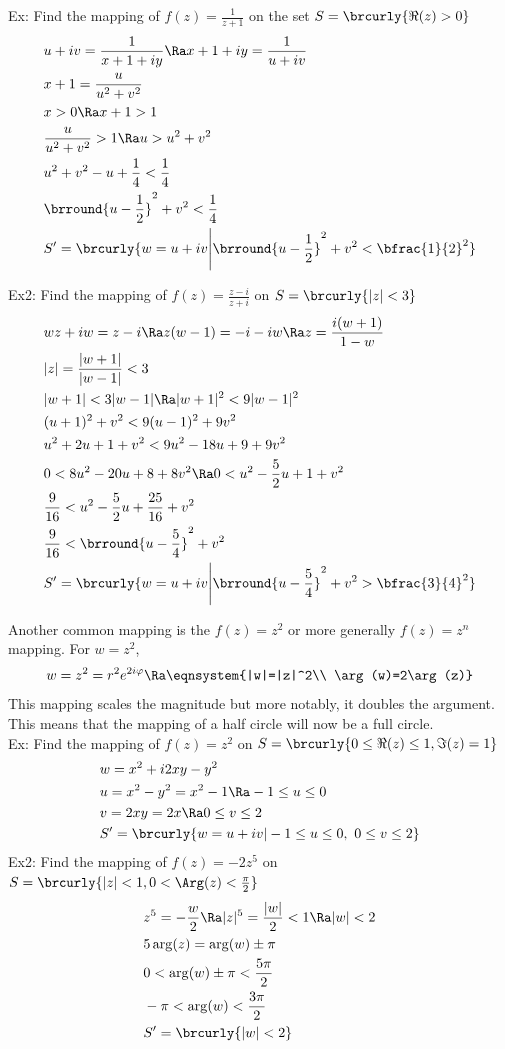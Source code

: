 Ex: Find the mapping of $f(z)=\frac{1}{z+1}$ on the set $S=\brcurly{\Re(z)>0}$ 
\begin{align*}
    &u+iv=\frac{1}{x+1+iy}\Ra x+1+iy=\frac{1}{u+iv}\\
    &x+1=\frac{u}{u^2+v^2}\\
    &x>0\Ra x+1>1\\
    &\frac{u}{u^2+v^2}>1\Ra u>u^2+v^2\\
    &u^2+v^2-u+\frac{1}{4}<\frac{1}{4}\\
    &\brround{u-\frac{1}{2}}^2+v^2<\frac{1}{4}\\
    &S'=\brcurly{w=u+iv\Bigg\vert\brround{u-\frac{1}{2}}^2+v^2<\bfrac{1}{2}^2}
\end{align*}

Ex2: Find the mapping of $f(z)=\frac{z-i}{z+i}$ on $S=\brcurly{|z|<3}$
\begin{align*}
    &wz+iw=z-i\Ra z(w-1)=-i-iw\Ra z=\frac{i(w+1)}{1-w}\\
    &|z|=\frac{|w+1|}{|w-1|}<3\\
    &|w+1|<3|w-1|\Ra |w+1|^2<9|w-1|^2\\
    &(u+1)^2+v^2<9(u-1)^2+9v^2\\
    &u^2+2u+1+v^2<9u^2-18u+9+9v^2\\
    &0<8u^2-20u+8+8v^2\Ra 0<u^2-\frac{5}{2}u+1+v^2\\
    &\frac{9}{16}<u^2-\frac{5}{2}u+\frac{25}{16}+v^2\\
    &\frac{9}{16}<\brround{u-\frac{5}{4}}^2+v^2\\
    &S'=\brcurly{w=u+iv\Bigg\vert\brround{u-\frac{5}{4}}^2+v^2>\bfrac{3}{4}^2}
\end{align*}

Another common mapping is the $f(z)=z^2$ or more generally $f(z)=z^n$ mapping.
For $w=z^2$,
\[w=z^2=r^2e^{2i\varphi}\Ra \eqnsystem{|w|=|z|^2\\ \arg(w)=2\arg(z)}\]
This mapping scales the magnitude but more notably, it doubles the argument. This means that the mapping of a half circle will now be a full circle.\\

Ex: Find the mapping of $f(z)=z^2$ on $S=\brcurly{0\leq \Re(z)\leq1,\Im(z)=1}$
\begin{align*}
    &w=x^2+i2xy-y^2\\
    &u=x^2-y^2=x^2-1\Ra -1\leq u\leq 0\\
    &v=2xy=2x\Ra 0\leq v\leq 2\\
    &S'=\brcurly{w=u+iv|-1\leq u\leq 0,\ 0\leq v\leq 2}
\end{align*}
Ex2: Find the mapping of $f(z)=-2z^5$ on $S=\brcurly{|z|<1,0<\Arg(z)<\frac{\pi}{2}}$
\begin{align*}
    &z^5=-\frac{w}{2}\Ra |z|^5=\frac{|w|}{2}<1\Ra |w|<2\\
    &5\arg(z)=\arg(w)\pm\pi \\
    &0<\arg(w)\pm\pi <\frac{5\pi}{2}\\
    &-\pi<\arg(w)<\frac{3\pi}{2}\\
    &S'=\brcurly{|w|<2}
\end{align*}

